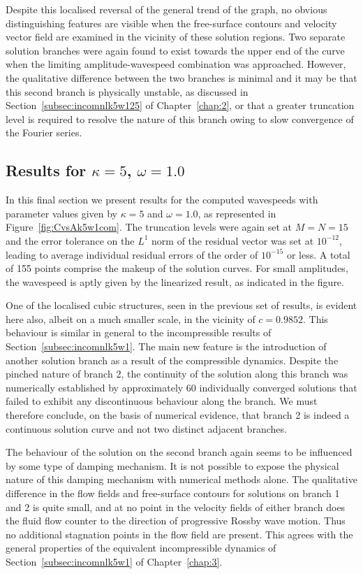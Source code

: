 Despite this localised reversal of the general trend of the graph, no obvious distinguishing features are visible when the free-surface contours and velocity vector field are examined in the vicinity of these solution regions. Two separate solution branches were again found to exist towards the upper end of the curve when the limiting amplitude-wavespeed combination was approached. However, the qualitative difference between the two branches is minimal and it may be that this second branch is physically unstable, as discussed in Section~\ref{subsec:incomnlk5w125} of Chapter~\ref{chap:2}, or that a greater truncation level is required to resolve the nature of this branch owing to slow convergence of the Fourier series.

\subsection[Results for $\kappa=5$, $\omega=1.0$]{Results for \boldmath$\kappa=5$, $\omega=1.0$}
In this final section we present results for the computed wavespeeds with parameter values given by $\kappa=5$ and $\omega=1.0$, as represented in Figure~\ref{fig:CvsAk5w1com}. The truncation levels were again set at $M=N=15$ and the error tolerance on the $L^1$ norm of the residual vector was set at $10^{-12}$, leading to average individual residual errors of the order of $10^{-15}$ or less. A total of 155 points comprise the makeup of the solution curves. For small amplitudes, the wavespeed is aptly given by the linearized result, as indicated in the figure.

One of the localised cubic structures, seen in the previous set of results, is evident here also, albeit on a much smaller scale, in the vicinity of $c=0.9852$. This behaviour is similar in general to the incompressible results of Section~\ref{subsec:incomnlk5w1}. The main new feature is the introduction of another solution branch as a result of the compressible dynamics. Despite the pinched nature of branch 2, the continuity of the solution along this branch was numerically established by approximately 60 individually converged solutions that failed to exhibit any discontinuous behaviour along the branch. We must therefore conclude, on the basis of numerical evidence, that branch 2 is indeed a continuous solution curve and not two distinct adjacent branches. 

The behaviour of the solution on the second branch again seems to be influenced by some type of damping mechanism. It is not possible to expose the physical nature of this damping mechanism with numerical methods alone. The qualitative difference in the flow fields and free-surface contours for solutions on branch 1 and 2 is quite small, and at no point in the velocity fields of either branch does the fluid flow counter to the direction of progressive Rossby wave motion. Thus no additional stagnation points in the flow field are present. This agrees with the general properties of the equivalent incompressible dynamics of Section~\ref{subsec:incomnlk5w1} of Chapter~\ref{chap:3}.

